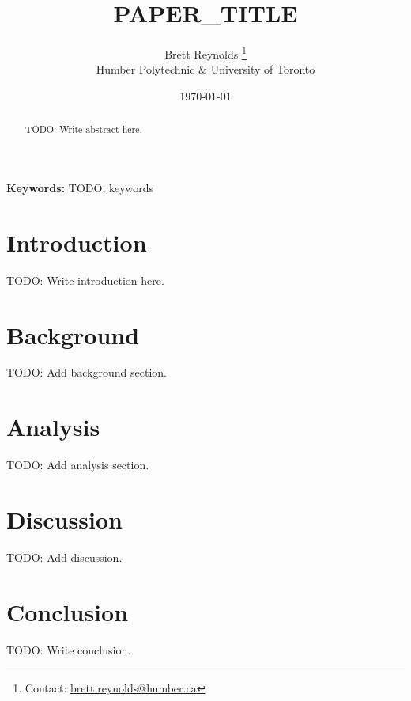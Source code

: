 \documentclass[12pt]{article}
\title{{{PAPER_TITLE}}}
\author{Brett Reynolds \orcidlink{0000-0003-0073-7195}%
\thanks{Contact: \href{mailto:brett.reynolds@humber.ca}{brett.reynolds@humber.ca}}\\
Humber Polytechnic \& University of Toronto}
\date{\today}
\begin{document}
\maketitle

\begin{abstract}
TODO: Write abstract here.
\end{abstract}

\noindent\textbf{Keywords:} TODO; keywords


\section{Introduction}

TODO: Write introduction here.

\section{Background}

TODO: Add background section.

\section{Analysis}

TODO: Add analysis section.

\section{Discussion}

TODO: Add discussion.

\section{Conclusion}

TODO: Write conclusion.


\clearpage
\printbibliography
\end{document}
